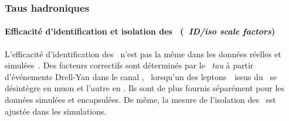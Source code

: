 \subsubsection{Taus hadroniques}
\paragraph{Efficacité d'identification et isolation des \tauh\ (\emph{\tauh\ ID/iso scale factors})}
L'efficacité d'identification des \tauh\ n'est pas la même dans les données réelles et simulées~\cite{TauPOG}.
Des facteurs correctifs sont déterminés par le \POG\ \emph{tau} à partir d'événements Drell-Yan dans le canal \mu\tauh, \ie\ lorsqu'un des leptons~\tau\ issus du \Zboson\ se désintègre en muon et l'autre en \tauh.
Ils sont de plus fournis séparément pour les données simulées et encapsulées.
De même, la mesure de l'isolation des \tauh\ est ajustée dans les simulations.

